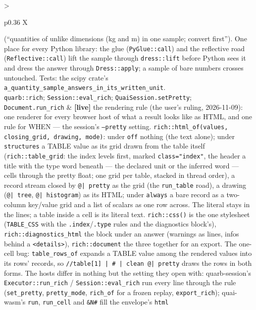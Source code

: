\documentclass{report}
\newcommand{\live}{\textbf{\textcolor{blue!60!black}{[live]}}\xspace}
\begin{document}
\begin{xltabular}{\textwidth}{>{\raggedright\arraybackslash}p{0.36\textwidth} X}
    (``quantities of unlike dimensions (kg and m) in one sample;
    convert first''). One place for every Python library: the glue
    (\texttt{PyGlue::call}) and the reflective road
    (\texttt{Reflective::call}) lift the sample through
    \texttt{dress::lift} before Python sees it and dress the answer
    through \texttt{Dress::apply}; a sample of bare numbers crosses
    untouched. Tests: the scipy crate's
    \texttt{a\_quantity\_sample\_answers\_in\_its\_written\_unit}. \\
\texttt{quarb::rich}; \texttt{Session::eval\_rich}; \texttt{QuaiSession.setPretty}; \texttt{Document.run\_rich}
  & \live the rendering rule (the user's ruling, 2026-11-09): one
    renderer for every browser host of what a result looks like as
    HTML, and one rule for WHEN — the session's \texttt{--pretty}
    setting. \texttt{rich::html\_of(values, closing\_grid, drawing,
    mode)}: under \texttt{off} nothing (the text alone); under
    \texttt{structures} a TABLE value as its grid drawn from the table
    itself (\texttt{rich::table\_grid}: the index levels first, marked
    \texttt{class="index"}, the header a title with the type word
    beneath — the declared unit or the inferred word — cells through
    the pretty float; one grid per table, stacked in thread order), a
    record stream closed by \texttt{@| pretty} as the grid (the
    \texttt{run\_table} road), a drawing (\texttt{@| tree},
    \texttt{@| histogram}) as its HTML; under \texttt{always} a bare
    record as a two-column key/value grid and a list of scalars as
    one row across. The literal stays in the lines; a table inside a
    cell is its literal text. \texttt{rich::css()} is the one
    stylesheet (\texttt{TABLE\_CSS} with the \texttt{.index}/\texttt{.type}
    rules and the diagnostics block's), \texttt{rich::diagnostics\_html}
    the block under an answer (warnings as lines, infos behind a
    \texttt{<details>}), \texttt{rich::document} the three together for an
    export. The one-cell bug: \texttt{table\_rows\_of} expands a TABLE
    value among the rendered values into its rows'
    records, so \texttt{//table[1] | \# | clean @| pretty} draws the
    rows in both forms. The hosts differ in nothing but the setting
    they open with: quarb-session's \texttt{Executor::run\_rich} /
    \texttt{Session::eval\_rich} run every line through the rule
    (\texttt{set\_pretty}, \texttt{pretty\_mode}, \texttt{rich\_of} for a
    frozen replay, \texttt{export\_rich}); quai-wasm's \texttt{run},
    \texttt{run\_cell} and \texttt{\&N\#} fill the envelope's \texttt{html}

\end{xltabular}
\end{document}
